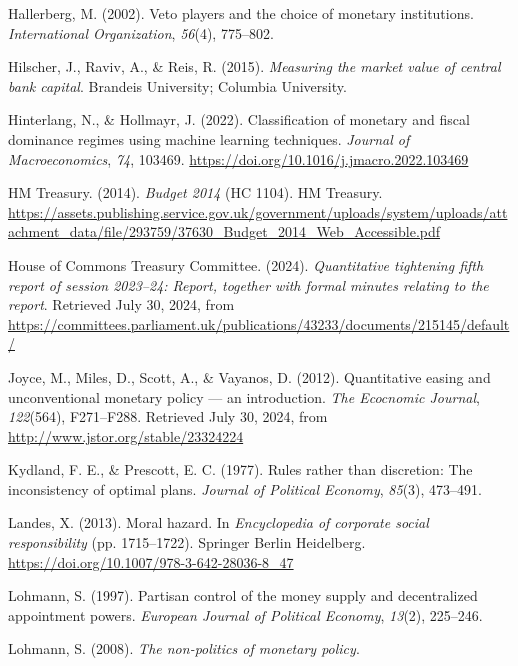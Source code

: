 \documentclass[
  a4paper,
  abstract=true]{scrartcl}
\newlength{\cslhangindent}
\newenvironment{CSLReferences}[2] %
 {\begin{list}{}{%
  \setlength{\itemindent}{0pt}
  \setlength{\leftmargin}{0pt}
  \setlength{\parsep}{0pt}
  \ifodd #1
   \setlength{\leftmargin}{\cslhangindent}
   \setlength{\itemindent}{-1\cslhangindent}
  \fi
  \setlength{\itemsep}{#2\baselineskip}}}
 {\end{list}}
\theoremstyle{definition}
\begin{document}
\begin{CSLReferences}{1}{0}
Hallerberg, M. (2002). Veto players and the choice of monetary
institutions. \emph{International Organization}, \emph{56}(4), 775--802.

Hilscher, J., Raviv, A., \& Reis, R. (2015). \emph{Measuring the market
value of central bank capital}. Brandeis University; Columbia
University.

Hinterlang, N., \& Hollmayr, J. (2022). Classification of monetary and
fiscal dominance regimes using machine learning techniques.
\emph{Journal of Macroeconomics}, \emph{74}, 103469.
\url{https://doi.org/10.1016/j.jmacro.2022.103469}

HM Treasury. (2014). \emph{Budget 2014} (HC 1104). HM Treasury.
\url{https://assets.publishing.service.gov.uk/government/uploads/system/uploads/attachment_data/file/293759/37630_Budget_2014_Web_Accessible.pdf}

House of Commons Treasury Committee. (2024). \emph{Quantitative
tightening fifth report of session 2023--24: Report, together with
formal minutes relating to the report}. Retrieved July 30, 2024, from
\url{https://committees.parliament.uk/publications/43233/documents/215145/default/}

Joyce, M., Miles, D., Scott, A., \& Vayanos, D. (2012). Quantitative
easing and unconventional monetary policy --- an introduction. \emph{The
Ecocnomic Journal}, \emph{122}(564), F271--F288. Retrieved July 30,
2024, from \url{http://www.jstor.org/stable/23324224}

Kydland, F. E., \& Prescott, E. C. (1977). Rules rather than discretion:
The inconsistency of optimal plans. \emph{Journal of Political Economy},
\emph{85}(3), 473--491.

Landes, X. (2013). Moral hazard. In \emph{Encyclopedia of corporate
social responsibility} (pp. 1715--1722). Springer Berlin Heidelberg.
\url{https://doi.org/10.1007/978-3-642-28036-8_47}

Lohmann, S. (1997). Partisan control of the money supply and
decentralized appointment powers. \emph{European Journal of Political
Economy}, \emph{13}(2), 225--246.

Lohmann, S. (2008). \emph{The non-politics of monetary policy}.


\end{CSLReferences}
\end{document}
